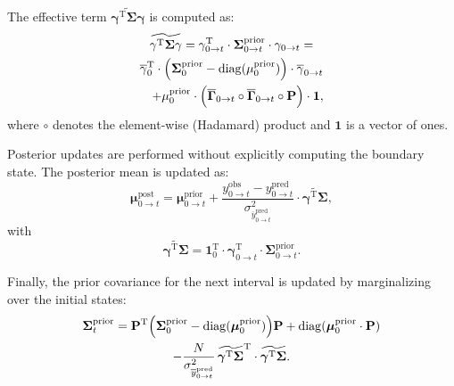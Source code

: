 \documentclass[pdflatex,sn-mathphys-num]{sn-jnl}%
\theoremstyle{thmstyleone}%
\theoremstyle{thmstyletwo}%
\theoremstyle{thmstylethree}%
\begin{document}
The effective term \( \widetilde{\mathbf{\gamma}^{\mathrm{T}} \mathbf{\Sigma}\mathbf{\gamma}} \) is computed as:
\begin{multline}
	\widetilde{\mathbf{\gamma}^{\mathrm{T}} \mathbf{\Sigma}\mathbf{\gamma}} = \mathbf{\gamma}^{\mathrm{T}}_{0 \rightarrow t} \cdot \mathbf{\Sigma}^{\text{prior}}_{0 \rightarrow t} \cdot \mathbf{\gamma}_{0 \rightarrow t} = \\
	\overline{\mathbf{\gamma}}_{0}^{\mathrm{T}} \cdot \Bigl( \mathbf{\Sigma}^{\text{prior}}_{0} - \mathrm{diag}(\mathbf{\mu}^{\text{prior}}_0) \Bigr) \cdot \overline{\mathbf{\gamma}}_{0 \rightarrow t} \\
	\quad + \mathbf{\mu}^{\text{prior}}_0 \cdot \Bigl( \overline{\mathbf{\Gamma}}_{0 \rightarrow t} \circ \overline{\mathbf{\Gamma}}_{0 \rightarrow t} \circ \mathbf{P} \Bigr) \cdot \mathbf{1},
	\label{eq:simplified_boundary_state}
\end{multline}
where \( \circ \) denotes the element-wise (Hadamard) product and \( \mathbf{1} \) is a vector of ones.

Posterior updates are performed without explicitly computing the boundary state. The posterior mean is updated as:
\begin{equation}
	\mathbf{\mu}^{\text{post}}_{0 \rightarrow t} = \mathbf{\mu}^{\text{prior}}_{0 \rightarrow t} + \frac{y^{\text{obs}}_{0 \rightarrow t} - y^{\text{pred}}_{0 \rightarrow t}}{\sigma^2_{\overline{y}^{\text{pred}}_{0 \rightarrow t}}} \cdot \widetilde{\boldsymbol{\gamma}^{\mathrm{T}} \boldsymbol{\Sigma}},
	\label{eq:macro_interval_posterior_mean}
\end{equation}
with
\begin{equation}
	\widetilde{\boldsymbol{\gamma}^{\mathrm{T}} \boldsymbol{\Sigma}} = \mathbf{1}_0^{\mathrm{T}} \cdot \mathbf{\gamma}^{\mathrm{T}}_{0 \rightarrow t} \cdot \mathbf{\Sigma}^{\text{prior}}_{0 \rightarrow t}.
	\label{eq:interval_gamma_sigma}
\end{equation}

Finally, the prior covariance for the next interval is updated by marginalizing over the initial states:
\begin{multline}
	\boldsymbol{\Sigma}^{\text{prior}}_{t} = \mathbf{P}^{\mathrm{T}} \Bigl( \boldsymbol{\Sigma}^{\text{prior}}_{0} - \mathrm{diag}(\boldsymbol{\mu}^{\text{prior}}_{0}) \Bigr) \mathbf{P} + \mathrm{diag}(\boldsymbol{\mu}^{\text{prior}}_{0} \cdot \mathbf{P}) \\
	- \frac{N}{\sigma^2_{\overline{y}^{\text{pred}}_{0 \rightarrow t}}} \, \widetilde{\boldsymbol{\gamma}^{\mathrm{T}} \boldsymbol{\Sigma}}^{\mathrm{T}} \cdot \widetilde{\boldsymbol{\gamma}^{\mathrm{T}} \boldsymbol{\Sigma}}.
	\label{eq:prior_covariance_update_0_t}
\end{multline}
\end{document}
